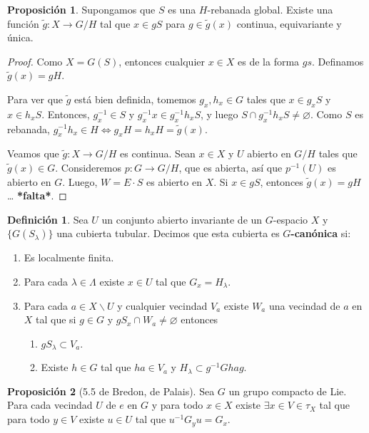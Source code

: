 \documentclass[spanish]{article}
\theoremstyle{definition}
\newtheorem*{defn}{Definición}
\newtheorem*{prop}{Proposición}
\begin{document}
\begin{prop}
	Supongamos que $S$ es una $H$-rebanada global. Existe una función ${\tilde{g}:X\to G/H}$ tal que $x\in gS$ para $g\in\tilde{g}(x)$ continua, equivariante y única.
\end{prop}
\begin{proof}
	Como $X=G(S)$, entonces cualquier $x\in X$ es de la forma $gs$. Definamos $\tilde{g}(x)=gH$.
	
	Para ver que $\tilde{g}$ está bien definida, tomemos $g_x,h_x\in G$ tales que $x\in g_xS$ y $x\in h_xS$. Entonces, $g_x^{-1}\in S$ y $g_x^{-1}x\in g_x^{-1}h_xS$, y luego $S\cap g^{-1}_xh_xS\neq\varnothing$. Como $S$ es rebanada, $g^{-1}_xh_x\in H\iff g_xH=h_xH= \tilde{g}(x)$.
	
	Veamos que $\tilde{g}:X\to G/H$ es continua. Sean $x\in X$ y $U$ abierto en $G/H$ tales que $\tilde{g}(x)\in G$. Consideremos $p:G\to G/H$, que es abierta, así que $p^{-1}(U)$ es abierto en $G$. Luego, $W=E\cdot S$ es abierto en $X$. Si $x\in gS$, entonces $\tilde{g}(x)=gH$ … \textbf{*falta*}.
\end{proof}

\begin{defn}
	Sea $U$ un conjunto abierto invariante de un $G$-espacio $X$ y $\{G(S_\lambda)\}$ una cubierta tubular. Decimos que esta cubierta es \textbf{$G$-canónica} si:
	\begin{enumerate}
		\item Es localmente finita.
		\item Para cada $\lambda\in\Lambda$ existe $x\in U$ tal que $G_x=H_\lambda$.
		\item Para cada $a\in X\backslash U$ y cualquier vecindad $V_a$ existe $W_a$ una vecindad de $a$ en $X$ tal que si $g\in G$ y $gS_x\cap W_a\neq\varnothing$ entonces
		\begin{enumerate}
			\item $gS_\lambda\subset V_a$.
			\item Existe $h\in G$ tal que $ha\in V_a$ y $H_\lambda\subset g^{-1}Ghag$.
		\end{enumerate}
	\end{enumerate}
\end{defn}

\begin{prop}[5.5 de Bredon, de Palais]
	Sea $G$ un grupo compacto de Lie. Para cada vecindad $U$ de $e$ en $G$ y para todo $x\in X$ existe $\exists x\in V\in \tau_X$ tal que para todo $y\in V$ existe $u\in U$ tal que $u^{-1}G_yu=G_x$.
\end{prop}
\end{document}
